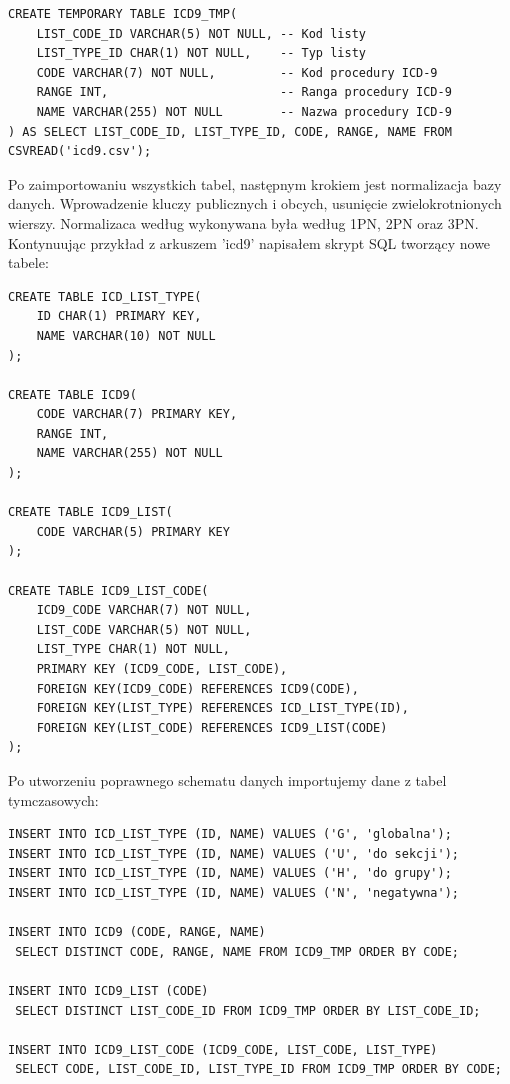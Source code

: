 \scriptsize
\begin{verbatim}
CREATE TEMPORARY TABLE ICD9_TMP(
    LIST_CODE_ID VARCHAR(5) NOT NULL, -- Kod listy
    LIST_TYPE_ID CHAR(1) NOT NULL,    -- Typ listy
    CODE VARCHAR(7) NOT NULL,         -- Kod procedury ICD-9
    RANGE INT,                        -- Ranga procedury ICD-9
    NAME VARCHAR(255) NOT NULL        -- Nazwa procedury ICD-9
) AS SELECT LIST_CODE_ID, LIST_TYPE_ID, CODE, RANGE, NAME FROM CSVREAD('icd9.csv');
\end{verbatim}
\normalsize

Po zaimportowaniu wszystkich tabel, następnym krokiem jest normalizacja bazy danych. Wprowadzenie kluczy publicznych i obcych, usunięcie zwielokrotnionych wierszy. Normalizaca według wykonywana była według 1PN, 2PN oraz 3PN. Kontynuując przykład z arkuszem 'icd9' napisałem skrypt SQL tworzący nowe tabele:

\scriptsize
\begin{verbatim}
CREATE TABLE ICD_LIST_TYPE(
    ID CHAR(1) PRIMARY KEY,
    NAME VARCHAR(10) NOT NULL
);

CREATE TABLE ICD9(
    CODE VARCHAR(7) PRIMARY KEY,
    RANGE INT,
    NAME VARCHAR(255) NOT NULL
);

CREATE TABLE ICD9_LIST(
    CODE VARCHAR(5) PRIMARY KEY
);

CREATE TABLE ICD9_LIST_CODE(
    ICD9_CODE VARCHAR(7) NOT NULL,
    LIST_CODE VARCHAR(5) NOT NULL,
    LIST_TYPE CHAR(1) NOT NULL,
    PRIMARY KEY (ICD9_CODE, LIST_CODE),
    FOREIGN KEY(ICD9_CODE) REFERENCES ICD9(CODE),
    FOREIGN KEY(LIST_TYPE) REFERENCES ICD_LIST_TYPE(ID),
    FOREIGN KEY(LIST_CODE) REFERENCES ICD9_LIST(CODE)
);
\end{verbatim}
\normalsize
Po utworzeniu poprawnego schematu danych importujemy dane z tabel tymczasowych:

\scriptsize
\begin{verbatim}
INSERT INTO ICD_LIST_TYPE (ID, NAME) VALUES ('G', 'globalna');
INSERT INTO ICD_LIST_TYPE (ID, NAME) VALUES ('U', 'do sekcji');
INSERT INTO ICD_LIST_TYPE (ID, NAME) VALUES ('H', 'do grupy');
INSERT INTO ICD_LIST_TYPE (ID, NAME) VALUES ('N', 'negatywna');

INSERT INTO ICD9 (CODE, RANGE, NAME)
 SELECT DISTINCT CODE, RANGE, NAME FROM ICD9_TMP ORDER BY CODE;

INSERT INTO ICD9_LIST (CODE)
 SELECT DISTINCT LIST_CODE_ID FROM ICD9_TMP ORDER BY LIST_CODE_ID;

INSERT INTO ICD9_LIST_CODE (ICD9_CODE, LIST_CODE, LIST_TYPE)
 SELECT CODE, LIST_CODE_ID, LIST_TYPE_ID FROM ICD9_TMP ORDER BY CODE;
\end{verbatim}
\normalsize

